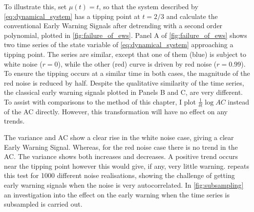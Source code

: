 To illustrate this, set $\mu(t) = t$, so that the system described by \cref{eq:dynamical_system} has
a tipping point at $t=2/3$ and calculate the conventional Early 
Warning Signals after detrending with a second order polynomial, plotted in \cref{fig:failure_of_ews}.
Panel A of \cref{fig:failure_of_ews} shows two time series of the 
state variable of \cref{eq:dynamical_system} approaching a tipping point.
The series are similar, except that one of them (blue) is subject to white noise ($r = 0$), 
while the other (red) curve is driven by red noise ($r = 0.99$). To
ensure the tipping occurs at a similar time in both
cases, the magnitude of the red noise is reduced by half.
Despite the qualitative similarity of the time series,
the classical early warning signals plotted in Panels B and C, are very different. To assist with comparisons to the method of this chapter, I
plot $\frac{1}{\delta t}\log AC$ instead of the AC directly. However, this
transformation will have no effect on any trends.

The variance and AC show a clear rise in
the white noise case, giving a clear Early Warning Signal. 
Whereas, for the red noise case there is no trend in the AC. The 
variance shows both increases and decreases. A positive trend occurs near
the tipping point however this would give, if any, very little warning. 
repeats this test for 1000 different noise realisations, showing the
challenge of getting early warning signals when the noise is very 
autocorrelated. In \cref{fig:subsampling} an investigation into the effect on the early warning when the time series
is subsampled is carried out.

